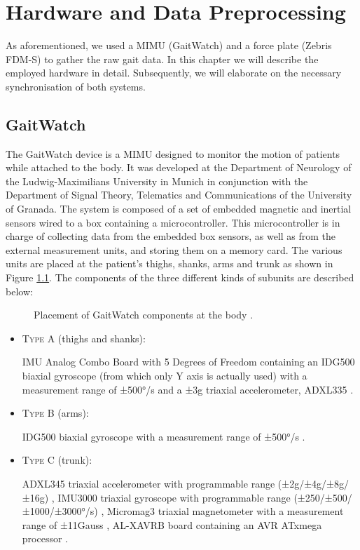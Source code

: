 \chapter{Hardware and Data Preprocessing}
\label{ch:Hardware}

As aforementioned, we used a MIMU (GaitWatch) and a force plate (Zebris FDM-S) to gather the raw gait data. In this chapter we will describe the employed hardware in detail. Subsequently, we will elaborate on the necessary synchronisation of both systems.

\section{GaitWatch}

The GaitWatch device \cite{olivares_vicente_gaitwatch_2013} is a MIMU designed to monitor the motion of patients while attached to the body. It was developed at the Department of Neurology of the Ludwig-Maximilians University in Munich in conjunction with the Department of Signal Theory, Telematics and Communications of the University of Granada. The system is composed of a set of embedded magnetic and inertial sensors wired to a box containing a microcontroller. This microcontroller is in charge of collecting data from the embedded box sensors, as well as from the external measurement units, and storing them on a memory card. The various units are placed at the patient's thighs, shanks, arms and trunk as shown in Figure \ref{fig:GaitWatch_placement}. The components of the three different kinds of subunits are described below:

\begin{figure}
	\centering
	\caption{Placement of GaitWatch components at the body \cite{olivares_vicente_gaitwatch_2013}.}
	\label{fig:GaitWatch_placement}
\end{figure}

\begin{itemize}

\item \textsc{Type A} (thighs and shanks): 

IMU Analog Combo Board with 5 Degrees of Freedom \cite{IMU5} containing an IDG500 biaxial gyroscope (from which only Y axis is actually used) with a measurement range of ±500°/s \cite{IDG500} and a ±3g triaxial accelerometer, ADXL335 \cite{ADXL335}.

\item \textsc{Type B} (arms):

IDG500 biaxial gyroscope with a measurement range of ±500°/s \cite{IDG500}.

\item \textsc{Type C} (trunk):

ADXL345 triaxial accelerometer with programmable range (±2g/±4g/±8g/±16g) \cite{ADXL345},
IMU3000 triaxial gyroscope with programmable range (±250/±500/±1000/±3000°/s) \cite{IMU3000}, 
Micromag3 triaxial magnetometer with a measurement range of ±11Gauss \cite{MicroMag3}, AL-XAVRB board containing an AVR ATxmega processor \cite{AVRATxmega}.

\end{itemize}


